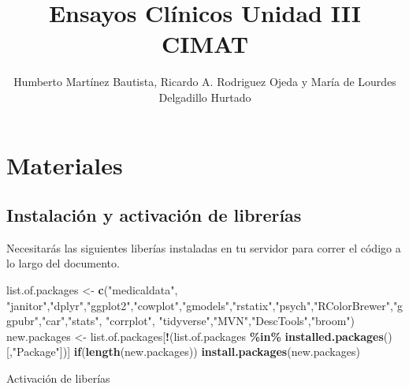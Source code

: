 \documentclass[
]{article}
\title{Ensayos Clínicos \textbar{} Unidad III \textbar{} CIMAT}
\author{Humberto Martínez Bautista, Ricardo A. Rodriguez Ojeda y María
de Lourdes Delgadillo Hurtado}
\date{}
\newenvironment{Shaded}{\begin{snugshade}}{\end{snugshade}}
\newcommand{\ControlFlowTok}[1]{\textcolor[rgb]{0.13,0.29,0.53}{\textbf{#1}}}
\newcommand{\FunctionTok}[1]{\textcolor[rgb]{0.13,0.29,0.53}{\textbf{#1}}}
\newcommand{\NormalTok}[1]{#1}
\newcommand{\OtherTok}[1]{\textcolor[rgb]{0.56,0.35,0.01}{#1}}
\newcommand{\SpecialCharTok}[1]{\textcolor[rgb]{0.81,0.36,0.00}{\textbf{#1}}}
\newcommand{\StringTok}[1]{\textcolor[rgb]{0.31,0.60,0.02}{#1}}
\begin{document}
\maketitle

{
\setcounter{tocdepth}{2}
\tableofcontents
}
\hypertarget{materiales}{%
\section{Materiales}\label{materiales}}

\hypertarget{instalaciuxf3n-y-activaciuxf3n-de-libreruxedas}{%
\subsection{Instalación y activación de
librerías}\label{instalaciuxf3n-y-activaciuxf3n-de-libreruxedas}}

Necesitarás las siguientes liberías instaladas en tu servidor para
correr el código a lo largo del documento.

\begin{Shaded}
\begin{Highlighting}[]
\NormalTok{list.of.packages }\OtherTok{\textless{}{-}} \FunctionTok{c}\NormalTok{(}\StringTok{"medicaldata"}\NormalTok{, }\StringTok{"janitor"}\NormalTok{,}\StringTok{"dplyr"}\NormalTok{,}\StringTok{"ggplot2"}\NormalTok{,}\StringTok{"cowplot"}\NormalTok{,}\StringTok{"gmodels"}\NormalTok{,}\StringTok{"rstatix"}\NormalTok{,}\StringTok{"psych"}\NormalTok{,}\StringTok{"RColorBrewer"}\NormalTok{,}\StringTok{"ggpubr"}\NormalTok{,}\StringTok{"car"}\NormalTok{,}\StringTok{"stats"}\NormalTok{, }\StringTok{"corrplot"}\NormalTok{, }\StringTok{"tidyverse"}\NormalTok{,}\StringTok{"MVN"}\NormalTok{,}\StringTok{"DescTools"}\NormalTok{,}\StringTok{"broom"}\NormalTok{)}
\NormalTok{new.packages }\OtherTok{\textless{}{-}}\NormalTok{ list.of.packages[}\SpecialCharTok{!}\NormalTok{(list.of.packages }\SpecialCharTok{\%in\%} \FunctionTok{installed.packages}\NormalTok{()[,}\StringTok{"Package"}\NormalTok{])]}
\ControlFlowTok{if}\NormalTok{(}\FunctionTok{length}\NormalTok{(new.packages)) }\FunctionTok{install.packages}\NormalTok{(new.packages)}
\end{Highlighting}
\end{Shaded}

Activación de liberías
\end{document}

